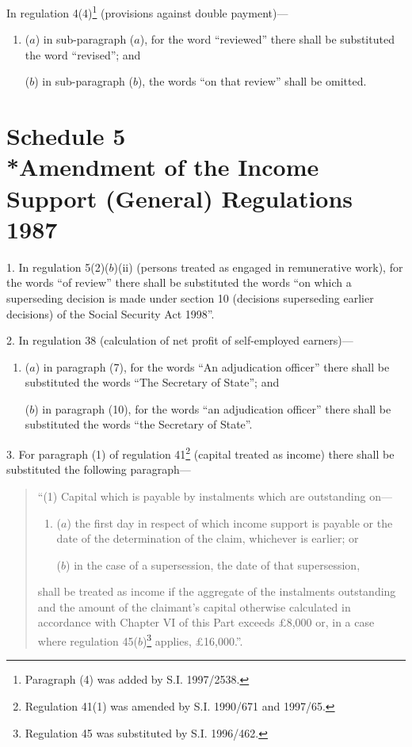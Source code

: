\documentclass[12pt,a4paper]{article}
\begin{document}
\renewcommand\parthead{--- Schedule 4}

In regulation 4(4)\footnote{\frenchspacing Paragraph (4) was added by S.I. 1997/2538.} (provisions against double payment)---
\begin{enumerate}\item[]
($a$) in sub-paragraph ($a$), for the word “reviewed” there shall be substituted the word “revised”; and

($b$) in sub-paragraph ($b$), the words “on that review” shall be omitted.
\end{enumerate}

\part[Schedule 5 --- Amendment of the Income Support (General) Regulations 1987]{Schedule 5\\*Amendment of the Income Support (General) Regulations 1987}

\renewcommand\parthead{--- Schedule 5}

1.  In regulation 5(2)($b$)(ii)  (persons treated as engaged in remunerative work), for the words “of review” there shall be substituted the words “on which a superseding decision is made under section 10 (decisions superseding earlier decisions) of the Social Security Act 1998”.

\medskip

2.  In regulation 38 (calculation of net profit of self-employed earners)---
\begin{enumerate}\item[]
($a$) in paragraph (7), for the words “An adjudication officer” there shall be substituted the words “The Secretary of State”; and

($b$) in paragraph (10), for the words “an adjudication officer” there shall be substituted the words “the Secretary of State”.
\end{enumerate}

\medskip

3.  For paragraph (1) of regulation 41\footnote{\frenchspacing Regulation 41(1) was amended by S.I. 1990/671 and 1997/65.} (capital treated as income) there shall be substituted the following paragraph---
\begin{quotation}
“(1) Capital which is payable by instalments which are outstanding on---
\begin{enumerate}\item[]
($a$) the first day in respect of which income support is payable or the date of the determination of the claim, whichever is earlier; or

($b$) in the case of a supersession, the date of that supersession,
\end{enumerate}
shall be treated as income if the aggregate of the instalments outstanding and the amount of the claimant’s capital otherwise calculated in accordance with Chapter VI of this Part exceeds £8,000 or, in a case where regulation 45($b$)\footnote{\frenchspacing Regulation 45 was substituted by S.I. 1996/462.} applies, £16,000.”.
\end{quotation}
\end{document}
